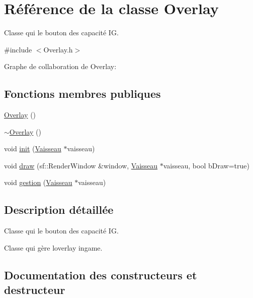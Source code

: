 \hypertarget{class_overlay}{}\section{Référence de la classe Overlay}
\label{class_overlay}


Classe qui le bouton des capacité IG.  




{\ttfamily \#include $<$Overlay.\+h$>$}



Graphe de collaboration de Overlay\+:
\subsection*{Fonctions membres publiques}
\begin{DoxyCompactItemize}
\item 
\hyperlink{class_overlay_ab4f509d502931bcaad03418470993d70}{Overlay} ()
\item 
\hyperlink{class_overlay_ad40a5e109ee4acbdec9f21d5496b7fa9}{$\sim$\+Overlay} ()
\item 
void \hyperlink{class_overlay_afce384f88db42331c819e361a90d943d}{init} (\hyperlink{class_vaisseau}{Vaisseau} $\ast$vaisseau)
\item 
void \hyperlink{class_overlay_a264955d57ee1b8c3d655321f26802e18}{draw} (sf\+::\+Render\+Window \&window, \hyperlink{class_vaisseau}{Vaisseau} $\ast$vaisseau, bool b\+Draw=true)
\item 
void \hyperlink{class_overlay_a39d341f16ea50172a8c2add7bfdf2843}{gestion} (\hyperlink{class_vaisseau}{Vaisseau} $\ast$vaisseau)
\end{DoxyCompactItemize}


\subsection{Description détaillée}
Classe qui le bouton des capacité IG. 

Classe qui gère l\textquotesingle{}overlay ingame. 

\subsection{Documentation des constructeurs et destructeur}
\mbox{\label{class_overlay_ab4f509d502931bcaad03418470993d70}} 
